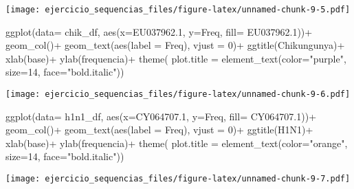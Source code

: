 \documentclass[
]{article}
\newenvironment{Shaded}{\begin{snugshade}}{\end{snugshade}}
\newcommand{\AttributeTok}[1]{\textcolor[rgb]{0.77,0.63,0.00}{#1}}
\newcommand{\DecValTok}[1]{\textcolor[rgb]{0.00,0.00,0.81}{#1}}
\newcommand{\FloatTok}[1]{\textcolor[rgb]{0.00,0.00,0.81}{#1}}
\newcommand{\FunctionTok}[1]{\textcolor[rgb]{0.00,0.00,0.00}{#1}}
\newcommand{\NormalTok}[1]{#1}
\newcommand{\SpecialCharTok}[1]{\textcolor[rgb]{0.00,0.00,0.00}{#1}}
\newcommand{\StringTok}[1]{\textcolor[rgb]{0.31,0.60,0.02}{#1}}
\begin{document}
\texttt{[image: ejercicio\_sequencias\_files/figure-latex/unnamed-chunk-9-5.pdf]}

\begin{Shaded}
\begin{Highlighting}[]
\FunctionTok{ggplot}\NormalTok{(}\AttributeTok{data=}\NormalTok{ chik\_df, }\FunctionTok{aes}\NormalTok{(}\AttributeTok{x=}\NormalTok{EU037962}\FloatTok{.1}\NormalTok{, }\AttributeTok{y=}\NormalTok{Freq, }\AttributeTok{fill=}\NormalTok{ EU037962}\FloatTok{.1}\NormalTok{))}\SpecialCharTok{+}
   \FunctionTok{geom\_col}\NormalTok{()}\SpecialCharTok{+}
   \FunctionTok{geom\_text}\NormalTok{(}\FunctionTok{aes}\NormalTok{(}\AttributeTok{label =}\NormalTok{ Freq), }\AttributeTok{vjust =} \DecValTok{0}\NormalTok{)}\SpecialCharTok{+}
   \FunctionTok{ggtitle}\NormalTok{(}\StringTok{\textquotesingle{}Chikungunya\textquotesingle{}}\NormalTok{)}\SpecialCharTok{+}
   \FunctionTok{xlab}\NormalTok{(}\StringTok{\textquotesingle{}base\textquotesingle{}}\NormalTok{)}\SpecialCharTok{+}
   \FunctionTok{ylab}\NormalTok{(}\StringTok{\textquotesingle{}frequencia\textquotesingle{}}\NormalTok{)}\SpecialCharTok{+}
   \FunctionTok{theme}\NormalTok{(}
   \AttributeTok{plot.title =}  \FunctionTok{element\_text}\NormalTok{(}\AttributeTok{color=}\StringTok{"purple"}\NormalTok{, }\AttributeTok{size=}\DecValTok{14}\NormalTok{, }\AttributeTok{face=}\StringTok{"bold.italic"}\NormalTok{))}
\end{Highlighting}
\end{Shaded}

\texttt{[image: ejercicio\_sequencias\_files/figure-latex/unnamed-chunk-9-6.pdf]}

\begin{Shaded}
\begin{Highlighting}[]
\FunctionTok{ggplot}\NormalTok{(}\AttributeTok{data=}\NormalTok{ h1n1\_df, }\FunctionTok{aes}\NormalTok{(}\AttributeTok{x=}\NormalTok{CY064707}\FloatTok{.1}\NormalTok{, }\AttributeTok{y=}\NormalTok{Freq, }\AttributeTok{fill=}\NormalTok{ CY064707}\FloatTok{.1}\NormalTok{))}\SpecialCharTok{+}
   \FunctionTok{geom\_col}\NormalTok{()}\SpecialCharTok{+}
   \FunctionTok{geom\_text}\NormalTok{(}\FunctionTok{aes}\NormalTok{(}\AttributeTok{label =}\NormalTok{ Freq), }\AttributeTok{vjust =} \DecValTok{0}\NormalTok{)}\SpecialCharTok{+}
   \FunctionTok{ggtitle}\NormalTok{(}\StringTok{\textquotesingle{}H1N1\textquotesingle{}}\NormalTok{)}\SpecialCharTok{+}
   \FunctionTok{xlab}\NormalTok{(}\StringTok{\textquotesingle{}base\textquotesingle{}}\NormalTok{)}\SpecialCharTok{+}
   \FunctionTok{ylab}\NormalTok{(}\StringTok{\textquotesingle{}frequencia\textquotesingle{}}\NormalTok{)}\SpecialCharTok{+}
   \FunctionTok{theme}\NormalTok{(}
   \AttributeTok{plot.title =}  \FunctionTok{element\_text}\NormalTok{(}\AttributeTok{color=}\StringTok{"orange"}\NormalTok{, }\AttributeTok{size=}\DecValTok{14}\NormalTok{, }\AttributeTok{face=}\StringTok{"bold.italic"}\NormalTok{))}
\end{Highlighting}
\end{Shaded}

\texttt{[image: ejercicio\_sequencias\_files/figure-latex/unnamed-chunk-9-7.pdf]}
\end{document}
